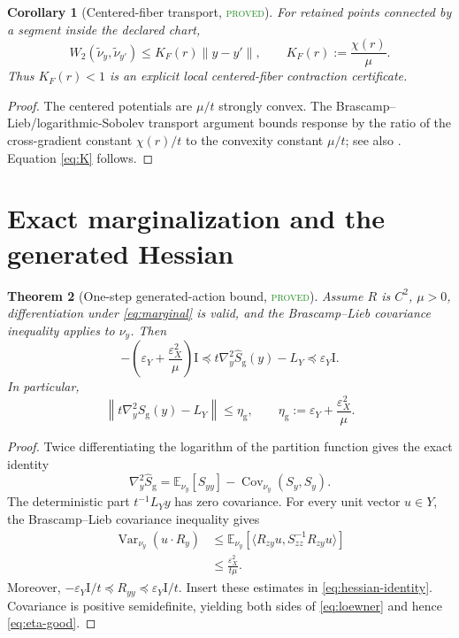 \documentclass[11pt]{article}
\newtheorem{theorem}{Theorem}[section]
\newtheorem{corollary}[theorem]{Corollary}
\theoremstyle{definition}
\newcommand{\E}{\mathbb E}
\newcommand{\Cov}{\operatorname{Cov}}
\newcommand{\Id}{\mathrm I}
\newcommand{\good}{\mathrm g}
\newcommand{\statusproved}{\textcolor{ForestGreen}{\textsc{proved}}}
\begin{document}
\begin{corollary}[Centered-fiber transport, \statusproved]
\label{cor:transport}
For retained points connected by a segment inside the declared chart,
\begin{equation}\label{eq:K}
 W_2(\widetilde\nu_y,\widetilde\nu_{y'})
 \le K_F(r)\|y-y'\|,
 \qquad
 K_F(r):=\frac{\chi(r)}{\mu}.
\end{equation}
Thus $K_F(r)<1$ is an explicit local centered-fiber contraction certificate.
\end{corollary}
\begin{proof}
The centered potentials are $\mu/t$ strongly convex.  The
Brascamp--Lieb/logarithmic-Sobolev transport argument bounds response by the
ratio of the cross-gradient constant $\chi(r)/t$ to the convexity constant
$\mu/t$; see also \cite{OttoVillani}.  Equation \eqref{eq:K} follows.
\end{proof}

\section{Exact marginalization and the generated Hessian}

\begin{theorem}[One-step generated-action bound, \statusproved]
\label{thm:generated}
Assume $R$ is $C^2$, $\mu>0$, differentiation under
\eqref{eq:marginal} is valid, and the Brascamp--Lieb covariance inequality
applies to $\nu_y$.  Then
\begin{equation}\label{eq:loewner}
 -\left(\varepsilon_Y+\frac{\varepsilon_X^2}{\mu}\right)\Id
 \preceq
 t\nabla_y^2\widehat S_{\good}(y)-L_Y
 \preceq \varepsilon_Y\Id.
\end{equation}
In particular,
\begin{equation}\label{eq:eta-good}
 \left\|t\nabla_y^2\widehat S_{\good}(y)-L_Y\right\|
 \le \eta_{\good},
 \qquad
 \eta_{\good}:=\varepsilon_Y+
 \frac{\varepsilon_X^2}{\mu}.
\end{equation}
\end{theorem}
\begin{proof}
Twice differentiating the logarithm of the partition function gives the exact
identity
\begin{equation}\label{eq:hessian-identity}
 \nabla_y^2\widehat S_{\good}
 =\E_{\nu_y}[S_{yy}]-\Cov_{\nu_y}(S_y,S_y).
\end{equation}
The deterministic part $t^{-1}L_Yy$ has zero covariance.  For every unit
vector $u\in Y$, the Brascamp--Lieb covariance inequality
\cite{BrascampLieb} gives
\begin{align*}
 \operatorname{Var}_{\nu_y}(u\cdot R_y)
 &\le \E_{\nu_y}\!\left[
  \langle R_{zy}u,S_{zz}^{-1}R_{zy}u\rangle\right]\\
 &\le \frac{\varepsilon_X^2}{t\mu}.
\end{align*}
Moreover, $-\varepsilon_Y\Id/t\preceq R_{yy}\preceq
\varepsilon_Y\Id/t$.  Insert these estimates in
\eqref{eq:hessian-identity}.  Covariance is positive semidefinite, yielding
both sides of \eqref{eq:loewner} and hence \eqref{eq:eta-good}.
\end{proof}
\end{document}
